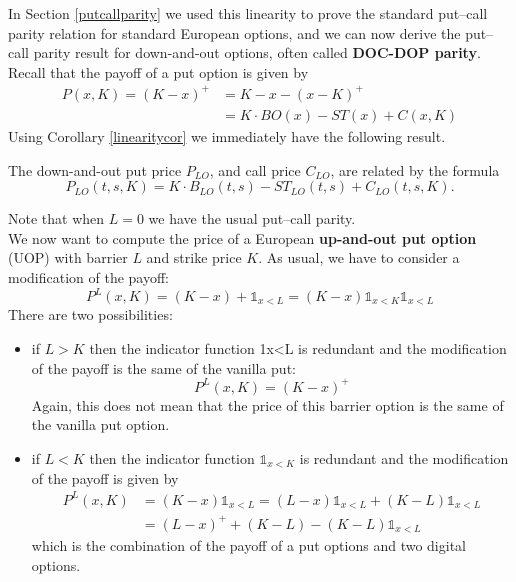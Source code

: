 In Section \ref{putcallparity} we used this linearity to prove the standard put–call parity relation for standard European options, and we can now derive the put–call parity result for down-and-out options, often called \textbf{DOC-DOP parity}. Recall that the payoff of a put option is given by
\begin{align*}
    P(x,K) = (K-x)^+ &= K - x - (x - K)^+ \\
    &=
    K\cdot BO(x) - ST(x) + C(x,K)
\end{align*}
Using Corollary \ref{linearitycor} we immediately have the following result.
\begin{proposition}
    The down-and-out put price $P_{LO}$, and call price $C_{LO}$, are related by the formula
    \begin{equation}
        P_{LO}(t, s, K) = K\cdot B_{LO}(t, s) - ST_{LO}(t,s) + C_{LO}(t, s, K).
    \end{equation}
\end{proposition}
Note that when $L = 0$ we have the usual put–call parity.\\
We now want to compute the price of a European \textbf{up-and-out put option} (UOP) with barrier $L$ and strike price $K$. As usual, we have to consider a modification of the payoff:
\begin{equation}
    P^L(x,K)=(K-x)+\mathds{1}_{x<L} = (K-x)\mathds{1}_{x<K}\mathds{1}_{x<L}
\end{equation}
There are two possibilities:
\begin{itemize}
    \item if $L > K$ then the indicator function 1x<L is redundant and the modification of the payoff is the same of the vanilla put:
    \begin{equation*}
        P^L(x, K) = (K - x)^+
    \end{equation*}
    Again, this does not mean that the price of this barrier option is the same of the vanilla put option.
    \item if $L < K$ then the indicator function $\mathds{1}_{x<K}$ is redundant and the modification of the payoff is given by
    \begin{align*}
        P^L(x, K) &= (K-x)\mathds{1}_{x<L} =(L-x)\mathds{1}_{x<L}+(K-L)\mathds{1}_{x<L} \\
        &=
        (L-x)^+ +(K-L)-(K-L)\mathds{1}_{x<L}
    \end{align*}
    which is the combination of the payoff of a put options and two digital options.
\end{itemize}
